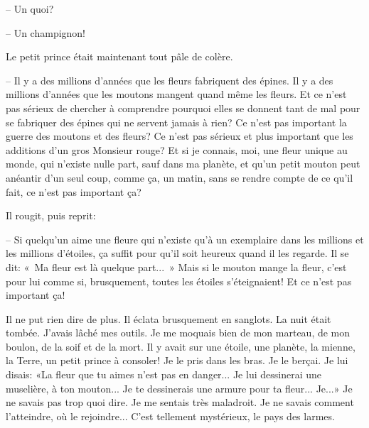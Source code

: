 \documentclass[a4paper]{report}
\begin{document}

-- Un quoi?

-- Un champignon!

Le petit prince était maintenant tout pâle de colère.

-- Il y a des millions d'années que les fleurs fabriquent des épines. Il y a des millions d'années que les moutons mangent quand même les fleurs. Et ce n'est pas sérieux de chercher à comprendre pourquoi elles se donnent tant de mal pour se fabriquer des épines qui ne servent jamais à rien? Ce n'est pas important la guerre des moutons et des fleurs? Ce n'est pas sérieux et plus important que les additions d'un gros Monsieur rouge? Et si je connais, moi, une fleur unique au monde, qui n'existe nulle part, sauf dans ma planète, et qu'un petit mouton peut anéantir d'un seul coup, comme ça, un matin, sans se rendre compte de ce qu'il fait, ce n'est pas important ça?

Il rougit, puis reprit:

-- Si quelqu'un aime une fleure qui n'existe qu'à un exemplaire dans les millions et les millions d'étoiles, ça suffit pour qu'il soit heureux quand il les regarde. Il se dit: «~Ma fleur est là quelque part...~» Mais si le mouton mange la fleur, c'est pour lui comme si, brusquement, toutes les étoiles s'éteignaient! Et ce n'est pas important ça!

Il ne put rien dire de plus. Il éclata brusquement en sanglots. La nuit était tombée. J'avais lâché mes outils. Je me moquais bien de mon marteau, de mon boulon, de la soif et de la mort. Il y avait sur une étoile, une planète, la mienne, la Terre, un petit prince à consoler! Je le pris dans les bras. Je le berçai. Je lui disais: «La fleur que tu aimes n'est pas en danger... Je lui dessinerai une muselière, à ton mouton... Je te dessinerais une armure pour ta fleur... Je...» Je ne savais pas trop quoi dire. Je me sentais très maladroit. Je ne savais comment l'atteindre, où le rejoindre... C'est tellement mystérieux, le pays des larmes.
\end{document}
